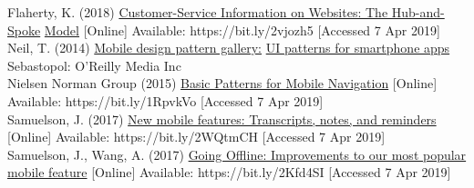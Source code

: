 \documentclass[version=last,fontsize=13pt]{scrartcl}
\begin{document}
Flaherty, K. (2018) \underline{Customer-Service Information on Websites: The Hub-and-Spoke} \underline{Model} [Online]  Available: https://bit.ly/2vjozh5 [Accessed 7 Apr 2019]\\

Neil, T. (2014) \underline{Mobile design pattern gallery:} \underline{UI patterns for smartphone apps}  Sebastopol: O'Reilly Media Inc\\

 Nielsen Norman Group (2015) \underline{Basic Patterns for Mobile Navigation} [Online] Available: https://bit.ly/1RpvkVo [Accessed 7 Apr 2019]\\

Samuelson, J. (2017) \underline{New mobile features: Transcripts, notes, and reminders}  [Online]  Available: https://bit.ly/2WQtmCH [Accessed 7 Apr 2019]\\

Samuelson, J., Wang, A. (2017) \underline{Going Offline: Improvements to our most popular} \underline{mobile feature} [Online] Available: https://bit.ly/2Kfd4SI [Accessed 7 Apr 2019]

\newpage
\end{document}
